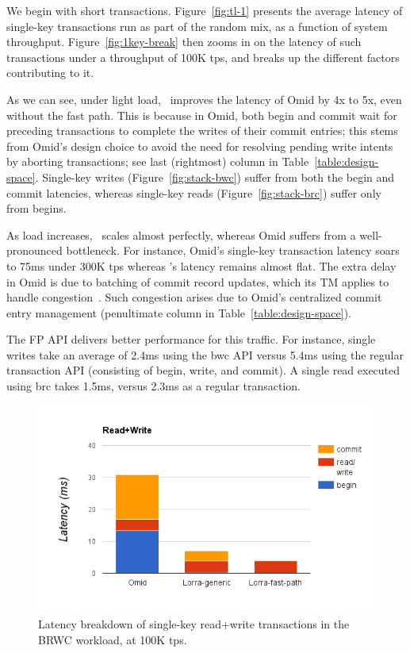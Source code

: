 We begin with short transactions. 
Figure~\ref{fig:tl-1} presents the average latency of single-key transactions run as part of the random mix,
as a function of {system} throughput.
Figure~\ref{fig:1key-break} then zooms in on the latency of such transactions under a throughput of 100K tps,
and breaks up the different factors contributing to it. 

As we can see, under light load, \sys\ improves the latency of Omid by 4x to 5x, even without the fast path.
This is because in Omid, both begin and commit wait for preceding transactions to complete the writes of 
their commit entries; this stems from Omid's design choice to avoid the need for resolving pending write intents
by aborting transactions; see last (rightmost) column in Table~\ref{table:design-space}. 
Single-key writes (Figure~\ref{fig:stack-bwc})
suffer from both the begin and commit latencies, whereas single-key reads (Figure~\ref{fig:stack-brc}) 
suffer only from begins. 

As load increases, \sys\ scales almost perfectly, whereas Omid suffers from a well-pronounced 
bottleneck. For instance, Omid's single-key transaction latency soars to 75ms under 300K tps whereas
{\sys}'s latency remains almost flat. The extra delay in Omid is due to batching of commit record updates, 
which its TM applies to handle congestion~\cite{Omid2017}. Such congestion arises due to Omid's centralized 
commit entry management (penultimate column in Table~\ref{table:design-space}).

The FP API delivers better performance for this traffic. For instance, single writes take an average of 2.4ms using 
the {\code bwc} API versus 5.4ms using the regular transaction API (consisting of begin, write, and commit). 
A single read executed using {\code brc} takes 1.5ms,  
versus 2.3ms as a regular transaction. 

\begin{figure}[htb]
\centering
\includegraphics[width=.45\textwidth]{figs/stack-br-wc.png}
\caption{Latency breakdown of single-key read+write transactions in the BRWC workload,
at 100K tps.}
\label{fig:rmw}
\end{figure}

